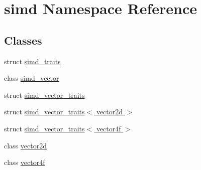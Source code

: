 \hypertarget{namespacesimd}{\section{simd Namespace Reference}
\label{namespacesimd}
}
\subsection*{Classes}
\begin{DoxyCompactItemize}
\item 
struct \hyperlink{structsimd_1_1simd__traits}{simd\+\_\+traits}
\item 
class \hyperlink{classsimd_1_1simd__vector}{simd\+\_\+vector}
\item 
struct \hyperlink{structsimd_1_1simd__vector__traits}{simd\+\_\+vector\+\_\+traits}
\item 
struct \hyperlink{structsimd_1_1simd__vector__traits_3_01vector2d_01_4}{simd\+\_\+vector\+\_\+traits$<$ vector2d $>$}
\item 
struct \hyperlink{structsimd_1_1simd__vector__traits_3_01vector4f_01_4}{simd\+\_\+vector\+\_\+traits$<$ vector4f $>$}
\item 
class \hyperlink{classsimd_1_1vector2d}{vector2d}
\item 
class \hyperlink{classsimd_1_1vector4f}{vector4f}
\end{DoxyCompactItemize}
